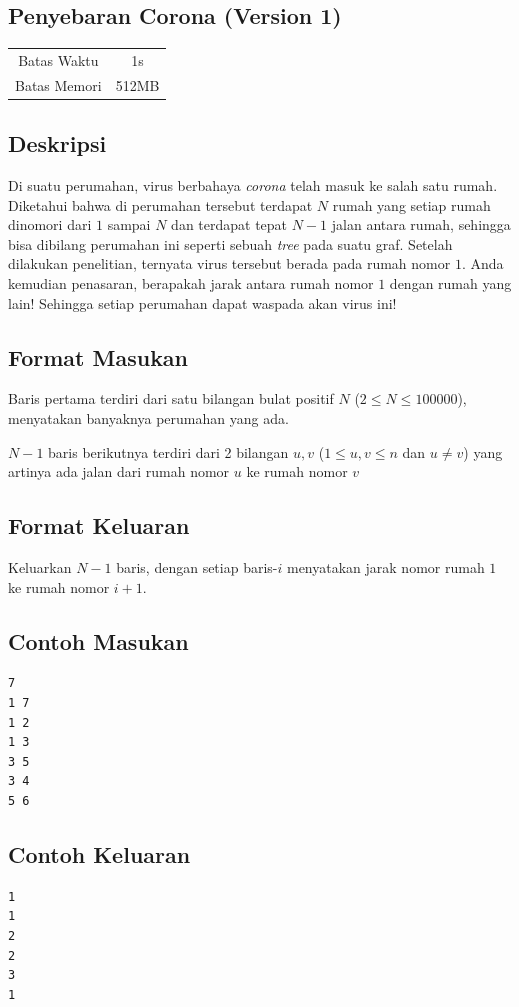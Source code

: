 \documentclass{article}
\begin{document}
\begin{center}
    \section*{Penyebaran Corona (Version 1)} %

    \begin{tabular}{ | c c | }
        \hline
        Batas Waktu  & 1s \\    %
        Batas Memori & 512MB \\  %
        \hline
    \end{tabular}
\end{center}

\subsection*{Deskripsi}

Di suatu perumahan, virus berbahaya \textit{corona} telah masuk ke salah satu rumah. Diketahui bahwa di perumahan tersebut terdapat $N$ rumah yang setiap rumah dinomori dari $1$ sampai $N$ dan terdapat tepat $N - 1$ jalan antara rumah, sehingga bisa dibilang perumahan ini seperti sebuah \textit{tree} pada suatu graf. Setelah dilakukan penelitian, ternyata virus tersebut berada pada rumah nomor $1$. Anda kemudian penasaran, berapakah jarak antara rumah nomor $1$ dengan rumah yang lain! Sehingga setiap perumahan dapat waspada akan virus ini!

\subsection*{Format Masukan}

Baris pertama terdiri dari satu bilangan bulat positif $N$ ($2 \leq N \leq 100000$), menyatakan banyaknya perumahan yang ada.

$N-1$ baris berikutnya terdiri dari 2 bilangan $u, v$ ($1 \leq u, v \leq n$ dan $u \neq v$) yang artinya ada jalan dari rumah nomor $u$ ke rumah nomor $v$

\subsection*{Format Keluaran}

Keluarkan $N - 1$ baris, dengan setiap baris-$i$ menyatakan jarak nomor rumah $1$ ke rumah nomor $i + 1$.
\begin{multicols}{2}
\subsection*{Contoh Masukan}
\begin{lstlisting}
7
1 7
1 2
1 3
3 5
3 4
5 6
\end{lstlisting}
\columnbreak
\subsection*{Contoh Keluaran}
\begin{lstlisting}
1
1
2
2
3
1
\end{lstlisting}
\vfill
\null
\end{multicols}
\end{document}
